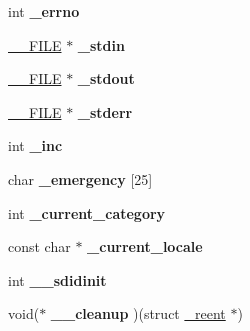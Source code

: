 \begin{DoxyCompactItemize}
\item 
int {\bfseries \+\_\+errno}\hypertarget{struct__reent_aa2018c00e4e6d13737fcc92a051e5c31}{}\label{struct__reent_aa2018c00e4e6d13737fcc92a051e5c31}

\item 
\hyperlink{struct____s_f_i_l_e}{\+\_\+\+\_\+\+F\+I\+LE} $\ast$ {\bfseries \+\_\+stdin}\hypertarget{struct__reent_ad171265329bc751cabc9b6468f8917af}{}\label{struct__reent_ad171265329bc751cabc9b6468f8917af}

\item 
\hyperlink{struct____s_f_i_l_e}{\+\_\+\+\_\+\+F\+I\+LE} $\ast$ {\bfseries \+\_\+stdout}\hypertarget{struct__reent_ab08562706a54f6ecddccb8ac17a8753b}{}\label{struct__reent_ab08562706a54f6ecddccb8ac17a8753b}

\item 
\hyperlink{struct____s_f_i_l_e}{\+\_\+\+\_\+\+F\+I\+LE} $\ast$ {\bfseries \+\_\+stderr}\hypertarget{struct__reent_a5dbc3be4306beff17d907c4fb4fc5b0a}{}\label{struct__reent_a5dbc3be4306beff17d907c4fb4fc5b0a}

\item 
int {\bfseries \+\_\+inc}\hypertarget{struct__reent_a4b429899dbc75585164a807e2b235a58}{}\label{struct__reent_a4b429899dbc75585164a807e2b235a58}

\item 
char {\bfseries \+\_\+emergency} \mbox{[}25\mbox{]}\hypertarget{struct__reent_a3a6976113082b5dae250e289f3e14ba5}{}\label{struct__reent_a3a6976113082b5dae250e289f3e14ba5}

\item 
int {\bfseries \+\_\+current\+\_\+category}\hypertarget{struct__reent_ac72b94ee625aaae4a185772c8f68b752}{}\label{struct__reent_ac72b94ee625aaae4a185772c8f68b752}

\item 
const char $\ast$ {\bfseries \+\_\+current\+\_\+locale}\hypertarget{struct__reent_a2b828dff99c6d0fb1c0037cf84d6e277}{}\label{struct__reent_a2b828dff99c6d0fb1c0037cf84d6e277}

\item 
int {\bfseries \+\_\+\+\_\+sdidinit}\hypertarget{struct__reent_a7e7b34bde20a94e1f67b3a122d883bac}{}\label{struct__reent_a7e7b34bde20a94e1f67b3a122d883bac}

\item 
void($\ast$ {\bfseries \+\_\+\+\_\+cleanup} )(struct \hyperlink{struct__reent}{\+\_\+reent} $\ast$)\hypertarget{struct__reent_a7f488b070580e2b1f122a31d850842e5}{}\label{struct__reent_a7f488b070580e2b1f122a31d850842e5}


\end{DoxyCompactItemize}
